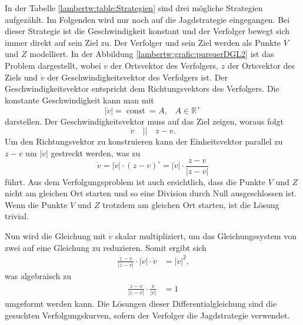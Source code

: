 %
In der Tabelle \ref{lambertw:table:Strategien} sind drei mögliche Strategien aufgezählt.
Im Folgenden wird nur noch auf die Jagdstrategie eingegangen.
Bei dieser Strategie ist die Geschwindigkeit konstant und der Verfolger bewegt sich immer direkt auf sein Ziel zu.
Der Verfolger und sein Ziel werden als Punkte $V$ und $Z$ modelliert.
In der Abbildung \ref{lambertw:grafic:pursuerDGL2} ist das Problem dargestellt,
wobei $v$ der Ortsvektor des Verfolgers, $z$ der Ortsvektor des Ziels und $\dot{v}$ der Geschwindigkeitsvektor des Verfolgers ist.
Der Geschwindigkeitsvektor entspricht dem Richtungsvektors des Verfolgers.
Die konstante Geschwindigkeit kann man mit
%
\begin{equation}
    |\dot{v}|
    = \operatorname{const} = A
    \text{,}\quad A\in\mathbb{R}^+
\end{equation}
%
darstellen. Der Geschwindigkeitsvektor muss auf das Ziel zeigen, woraus folgt
\begin{equation}
    \dot{v}
    \quad||\quad
    z-v
    \text{.}
\end{equation}
Um den Richtungsvektor zu konstruieren kann der Einheitsvektor parallel zu $z-v$ um $|\dot{v}|$ gestreckt werden, was zu
\begin{equation}
    \dot{v}
    =
    |\dot{v}|\cdot (z-v)^\circ
    =
    |\dot{v}|\cdot\frac{z-v}{|z-v|}
    \label{lambertw:richtungsvektor}
\end{equation}
führt.
Aus dem Verfolgungsproblem ist auch ersichtlich, dass die Punkte $V$ und $Z$ nicht am gleichen Ort starten und so eine Division durch Null ausgeschlossen ist.
Wenn die Punkte $V$ und $Z$ trotzdem am gleichen Ort starten, ist die Lösung trivial.

Nun wird die Gleichung mit $\dot{v}$ skalar multipliziert, um das Gleichungssystem von zwei auf eine Gleichung zu reduzieren. Somit ergibt sich
\begin{align}
    \frac{z-v}{|z-v|}\cdot|\dot{v}|\cdot\dot{v}
    &=
    |\dot{v}|^2
    \text{,}
\end{align}
was algebraisch zu
\begin{align}
    \label{lambertw:pursuerDGL}
    \frac{z-v}{|z-v|}\cdot \frac{\dot{v}}{|\dot{v}|}
    &=
    1
\end{align}
umgeformt werden kann.
Die Lösungen dieser Differentialgleichung sind die gesuchten Verfolgungskurven, sofern der Verfolger die Jagdstrategie verwendet.
%
